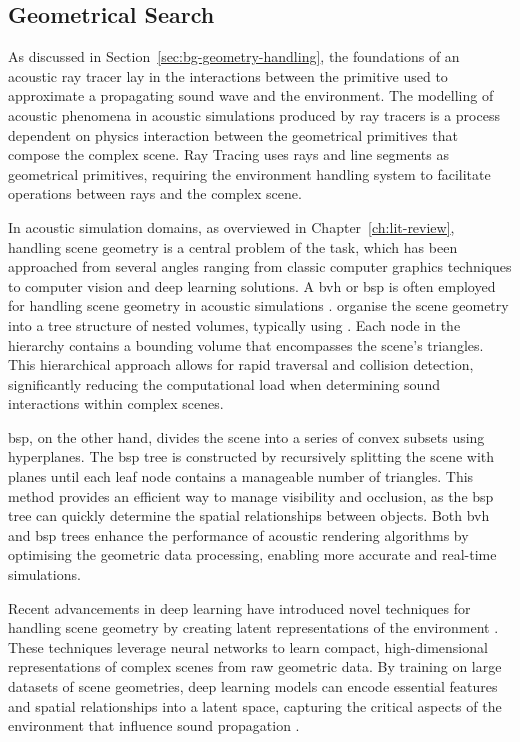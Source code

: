 \subsection{Geometrical Search}
As discussed in Section~\ref{sec:bg-geometry-handling}, the foundations of an acoustic ray tracer lay in the interactions between the primitive used to approximate a propagating sound wave and the environment. The modelling of acoustic phenomena in acoustic simulations produced by ray tracers is a process dependent on physics interaction between the geometrical primitives that compose the complex scene. Ray Tracing uses rays and line segments as geometrical primitives, requiring the environment handling system to facilitate operations between rays and the complex scene.\par
In acoustic simulation domains, as overviewed in Chapter~\ref{ch:lit-review}, handling scene geometry is a central problem of the task, which has been approached from several angles ranging from classic computer graphics techniques to computer vision and deep learning solutions.
A \acrfull{bvh} or \acrfull{bsp} is often employed for handling scene geometry in acoustic simulations \citep{schroder2011physically}.  organise the scene geometry into a tree structure of nested volumes, typically using . Each node in the hierarchy contains a bounding volume that encompasses the scene's triangles. This hierarchical approach allows for rapid traversal and collision detection, significantly reducing the computational load when determining sound interactions within complex scenes.\par
\acrshort{bsp}, on the other hand, divides the scene into a series of convex subsets using hyperplanes. The \acrshort{bsp} tree is constructed by recursively splitting the scene with planes until each leaf node contains a manageable number of triangles. This method provides an efficient way to manage visibility and occlusion, as the \acrshort{bsp} tree can quickly determine the spatial relationships between objects. Both \acrshort{bvh} and \acrshort{bsp} trees enhance the performance of acoustic rendering algorithms by optimising the geometric data processing, enabling more accurate and real-time simulations.\par
Recent advancements in deep learning have introduced novel techniques for handling scene geometry by creating latent representations of the environment \citep{liang2023neural}. These techniques leverage neural networks to learn compact, high-dimensional representations of complex scenes from raw geometric data. By training on large datasets of scene geometries, deep learning models can encode essential features and spatial relationships into a latent space, capturing the critical aspects of the environment that influence sound propagation \citep{ratnarajah2022mesh2ir, ahn2023novel}.
